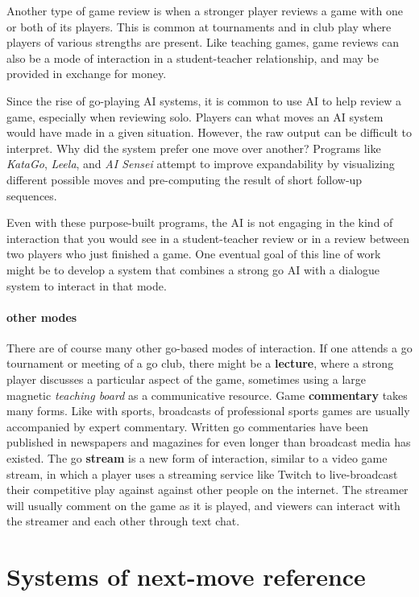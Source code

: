 \documentclass{scrartcl}
\begin{document}
Another type of game review is when a stronger player 
reviews a game with one or both of its players. 
This is common at tournaments and in club play where 
players of various strengths are present.
Like teaching games, game reviews can also be a mode
of interaction in a student-teacher relationship,
and may be provided in exchange for money.

Since the rise of go-playing AI systems, 
it is common to use AI to help review a game,
especially when reviewing solo.
Players can what moves an AI system would have made in a given situation.
However, the raw output can be difficult to interpret.
Why did the system prefer one move over another?
Programs like \textit{KataGo}, \textit{Leela}, and \textit{AI Sensei}
attempt to improve expandability by visualizing different
possible moves and pre-computing the result of short 
follow-up sequences.

Even with these purpose-built programs,
the AI is not engaging in the kind of   
interaction that you would see in a student-teacher
review or in a review between two players who just finished a game.
One eventual goal of this line of work might be to develop
a system that combines a strong go AI with a dialogue system
to interact in that mode.

\paragraph{other modes} There are of course many other
go-based modes of interaction.
If one attends a go tournament or meeting of a go club,
there might be a \textbf{lecture}, 
where a strong player discusses a particular aspect of the game,
sometimes using a large magnetic \emph{teaching board} 
as a communicative resource.
Game \textbf{commentary} takes many forms.
Like with sports, broadcasts of professional sports games
are usually accompanied by expert commentary.
Written go commentaries have been published in newspapers
and magazines for even longer than broadcast media has existed.
The go \textbf{stream} is a new form of interaction,
similar to a video game stream,
in which a player uses a streaming service like Twitch to live-broadcast 
their competitive play against against other people on the internet.
The streamer will usually comment on the game as it is played,
and viewers can interact with the streamer and each other through text chat.

\section{Systems of next-move reference}\label{sec:systems}
\end{document}
